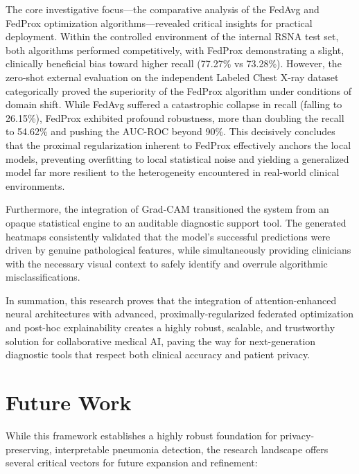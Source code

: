 \documentclass[12pt,a4paper]{report}
\begin{document}
The core investigative focus—the comparative analysis of the FedAvg and FedProx optimization algorithms—revealed critical insights for practical deployment. Within the controlled environment of the internal RSNA test set, both algorithms performed competitively, with FedProx demonstrating a slight, clinically beneficial bias toward higher recall (77.27\% vs 73.28\%). However, the zero-shot external evaluation on the independent Labeled Chest X-ray dataset categorically proved the superiority of the FedProx algorithm under conditions of domain shift. While FedAvg suffered a catastrophic collapse in recall (falling to 26.15\%), FedProx exhibited profound robustness, more than doubling the recall to 54.62\% and pushing the AUC-ROC beyond 90\%. This decisively concludes that the proximal regularization inherent to FedProx effectively anchors the local models, preventing overfitting to local statistical noise and yielding a generalized model far more resilient to the heterogeneity encountered in real-world clinical environments.

Furthermore, the integration of Grad-CAM transitioned the system from an opaque statistical engine to an auditable diagnostic support tool. The generated heatmaps consistently validated that the model’s successful predictions were driven by genuine pathological features, while simultaneously providing clinicians with the necessary visual context to safely identify and overrule algorithmic misclassifications.

In summation, this research proves that the integration of attention-enhanced neural architectures with advanced, proximally-regularized federated optimization and post-hoc explainability creates a highly robust, scalable, and trustworthy solution for collaborative medical AI, paving the way for next-generation diagnostic tools that respect both clinical accuracy and patient privacy.


\chapter{Future Work}

While this framework establishes a highly robust foundation for privacy-preserving, interpretable pneumonia detection, the research landscape offers several critical vectors for future expansion and refinement:
\end{document}
